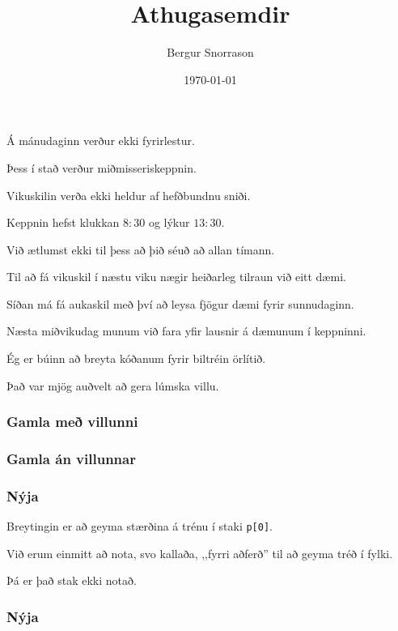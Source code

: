\title{Athugasemdir}
\author{Bergur Snorrason}
\date{\today}



\frame{\titlepage}

{
	{
		\item<1-> Á mánudaginn verður ekki fyrirlestur.
		\item<2-> Þess í stað verður miðmisseriskeppnin.
		\item<3-> Vikuskilin verða ekki heldur af hefðbundnu sniði.
		\item<4-> Keppnin hefst klukkan $8:30$ og lýkur $13:30$.
		\item<5-> Við ætlumst ekki til þess að þið séuð að allan tímann.
		\item<6-> Til að fá vikuskil í næstu viku nægir heiðarleg tilraun við eitt dæmi.
		\item<7-> Síðan má fá aukaskil með því að leysa fjögur dæmi fyrir sunnudaginn.
		\item<8-> Næsta miðvikudag munum við fara yfir lausnir á dæmunum í keppninni.
	}
}

{
	{
		\item<1-> Ég er búinn að breyta kóðanum fyrir biltréin örlítið.
		\item<2-> Það var mjög auðvelt að gera lúmska villu.
	}
}

{
	\frametitle{Gamla með villunni}
}

{
	\frametitle{Gamla án villunnar}
}

{
	\frametitle{Nýja}
}

{
	{
		\item<1-> Breytingin er að geyma stærðina á trénu í staki \texttt{p[0]}.
		\item<2-> Við erum einmitt að nota, svo kallaða, ,,fyrri aðferð'' til að geyma tréð í fylki.
		\item<3-> Þá er það stak ekki notað.
	}
}

{
	\frametitle{Nýja}
}

{
}


